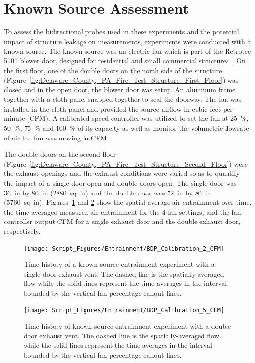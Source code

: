 \documentclass[12pt,oneside]{book}
\begin{document}
\clearpage

\section{Known Source Assessment}
\label{sec:known}

To assess the bidirectional probes used in these experiments and the potential impact of structure leakage on measurements, experiments were conducted with a known source. The known source was an electric fan which is part of the Retrotec 5101 blower door, designed for residential and small commercial structures~\cite{RetroTecManual}. On the first floor, one of the double doors on the north side of the structure (Figure~\ref{fig:Delaware_County,_PA_Fire_Test_Structure_First_Floor}) was closed and in the open door, the blower door was setup. An aluminum frame together with a cloth panel snapped together to seal the doorway. The fan was installed in the cloth panel and provided the source airflow in cubic feet per minute (CFM). A calibrated speed controller was utilized to set the fan at 25~\%, 50~\%, 75~\% and 100~\% of its capacity as well as monitor the volumetric flowrate of air the fan was moving in CFM. 

The double doors on the second floor (Figure~\ref{fig:Delaware_County,_PA_Fire_Test_Structure_Second_Floor}) were the exhaust openings and the exhaust conditions were varied so as to quantify the impact of a single door open and double doors open. The single door was 36~in by 80~in (2880~sq~in) and the double door was 72~in by 80~in (5760~sq~in). Figures~\ref{fig:known_single_door} and \ref{fig:known_double_door} show the spatial average air entrainment over time, the time-averaged measured air entrainment for the 4 fan settings, and the fan controller output CFM for a single exhaust door and the double exhaust door, respectively. 


\begin{figure}[!ht]
\centering
\texttt{[image: Script\_Figures/Entrainment/BDP\_Calibration\_2\_CFM]} 
\caption[Comparison of Known Source to Measured CFM with Single Door Exhaust]{Time history of a known source entrainment experiment with a single door exhaust vent. The dashed line is the spatially-averaged flow while the solid lines represent the time averages in the interval bounded by the vertical fan percentage callout lines.}
\label{fig:known_single_door}
\end{figure}

\begin{figure}[!ht]
\centering
\texttt{[image: Script\_Figures/Entrainment/BDP\_Calibration\_5\_CFM]} 
\caption[Comparison of Known Source to Measured CFM with Double Door Exhaust]{Time history of known source entrainment experiment with a double door exhaust vent. The dashed line is the spatially-averaged flow while the solid lines represent the time averages in the interval bounded by the vertical fan percentage callout lines.}
\label{fig:known_double_door}
\end{figure}
\end{document}
